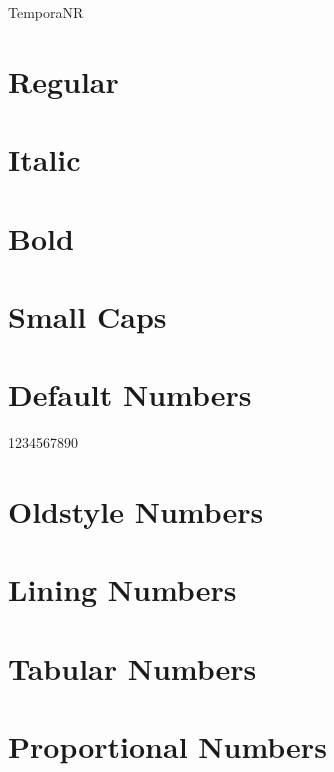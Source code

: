 \documentclass[a4paper]{article}
\begin{document}
\thispagestyle{empty}

\begin{center}\huge TemporaNR
\end{center}


\section*{Regular}
\lipsum[1]

\section*{Italic}
\textit{\lipsum[2]}

\section*{Bold}
\textbf{\lipsum[1]}

\section*{Small Caps}
\textsc{\lipsum[1]}

\section*{Default Numbers}

1234567890

\section*{Oldstyle Numbers}


\section*{Lining Numbers}


\section*{Tabular Numbers}


\section*{Proportional Numbers}

\end{document}
